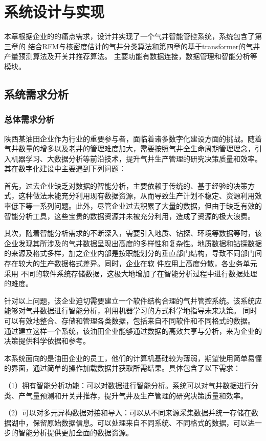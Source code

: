 \chapter{系统设计与实现}
本章根据企业的的痛点需求，设计并实现了一个气井智能管控系统，系统包含了第三章的
结合RFM与核密度估计的气井分类算法和第四章的基于transformer的气井产量预测算法及开关井推荐算法。
主要功能有数据连接，数据管理和智能分析等模块。
\section{系统需求分析}
\subsection{总体需求分析}
陕西某油田企业作为行业的重要参与者，面临着诸多数字化建设方面的挑战。随着气井数量的增多以及老井的管理难度加大，需要按照气井全生命周期管理理念，引入机器学习、大数据分析等前沿技术，提升气井生产管理的研究决策质量和效率。其在数字化建设中主要遇到下列问题：

首先，过去企业缺乏对数据的智能分析，主要依赖于传统的、基于经验的决策方式，这种做法未能充分利用现有数据资源，从而导致生产计划不稳定、资源利用效率低下等一系列问题。此外，尽管企业过去积累了大量的数据，但由于缺乏有效的智能分析工具，这些宝贵的数据资源并未被充分利用，造成了资源的极大浪费。

其次，随着智能分析需求的不断深入，需要引入地质、钻探、环境等数据等时，该企业发现其所涉及的气井数据呈现出高度的多样性和复杂性。地质数据和钻探数据的来源及格式多样，加之企业内部是按职能划分的垂直部门结构，导致不同部门间存在较大的生产数据格式差异。同时，企业在软
件应用上高度分散，各业务单元采用
不同的软件系统存储数据，这极大地增加了在智能分析过程中进行数据处理的难度。

针对以上问题，该企业迫切需要建立一个软件结构合理的气井管控系统。该系统应能够对气井数据进行智能分析，利用机器学习的方式科学地指导未来决策。
同时可以有效地整合、存储和管理各类数据，包括来自不同软件和不同格式的数据。
通过建立这样一个系统，该油田企业能够通过数据的高效共享与分析，来为企业的决策提供科学依据和参考。

本系统面向的是油田企业的员工，他们的计算机基础较为薄弱，期望使用简单易懂的界面，通过简单的操作加载数据并获取所需结果。具体包含了以下需求：

（1）拥有智能分析功能：可以对数据进行智能分析。系统可以对气井数据进行分类、产气量预测和开关井推荐，提升气井及生产管理的研究决策质量和效率。

（2）可以对多元异构数据对接和导入：可以从不同来源采集数据并统一存储在数据湖中，保留原始数据信息。可以处理来自不同系统、不同格式的数据，可以进一步的智能分析提供更加全面的数据资源。

